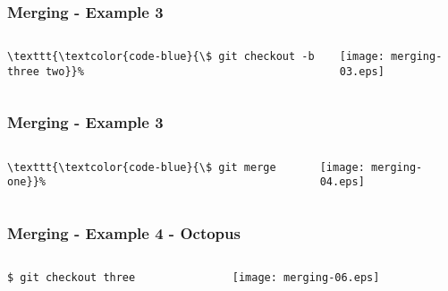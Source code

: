\documentclass[english]{beamer}
\newcommand{\CMD}[1]{%
\texttt{\textcolor{code-blue}{#1}}%
}
\begin{document}
\begin{frame}[fragile]
\frametitle{Merging - Example 3}

\begin{columns}[t]
        \begin{column}[T]{.5\textwidth}
                {\small
                \begin{Verbatim}[commandchars=\\\{\}]
\CMD{\$ git checkout -b three two}
                \end{Verbatim}
                }
        \end{column}
        \begin{column}[T]{.5\textwidth}
                \texttt{[image: merging-03.eps]}
        \end{column}
\end{columns}
\end{frame}

\begin{frame}[fragile]
\frametitle{Merging - Example 3}

\begin{columns}[t]
        \begin{column}[T]{.5\textwidth}
                {\small
                \begin{Verbatim}[commandchars=\\\{\}]
\CMD{\$ git merge one}
                \end{Verbatim}
                }
        \end{column}
        \begin{column}[T]{.5\textwidth}
                \texttt{[image: merging-04.eps]}
        \end{column}
\end{columns}
\end{frame}

\begin{frame}
\frametitle{Merging - Example 4 - Octopus}

\begin{columns}[t]
        \begin{column}[T]{.5\textwidth}
                {\small
                \CMD{\$ git checkout three} \\
                }
        \end{column}
        \begin{column}[T]{.5\textwidth}
                \texttt{[image: merging-06.eps]}
        \end{column}
\end{columns}
\end{frame}
\end{document}
